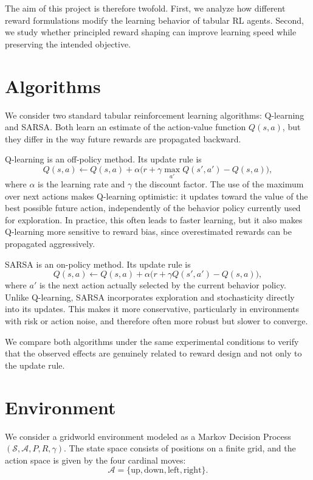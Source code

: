 \documentclass[10pt]{article}
\begin{document}
The aim of this project is therefore twofold. First, we analyze how different reward formulations modify the learning behavior of tabular RL agents. Second, we study whether principled reward shaping can improve learning speed while preserving the intended objective.

\section{Algorithms}

We consider two standard tabular reinforcement learning algorithms: Q-learning and SARSA. Both learn an estimate of the action-value function $Q(s,a)$, but they differ in the way future rewards are propagated backward.

Q-learning is an off-policy method. Its update rule is
\[
	Q(s,a) \leftarrow Q(s,a) + \alpha \bigl(r + \gamma \max_{a'} Q(s',a') - Q(s,a)\bigr),
\]
where $\alpha$ is the learning rate and $\gamma$ the discount factor. The use of the maximum over next actions makes Q-learning optimistic: it updates toward the value of the best possible future action, independently of the behavior policy currently used for exploration. In practice, this often leads to faster learning, but it also makes Q-learning more sensitive to reward bias, since overestimated rewards can be propagated aggressively.

SARSA is an on-policy method. Its update rule is
\[
	Q(s,a) \leftarrow Q(s,a) + \alpha \bigl(r + \gamma Q(s',a') - Q(s,a)\bigr),
\]
where $a'$ is the next action actually selected by the current behavior policy. Unlike Q-learning, SARSA incorporates exploration and stochasticity directly into its updates. This makes it more conservative, particularly in environments with risk or action noise, and therefore often more robust but slower to converge.

We compare both algorithms under the same experimental conditions to verify that the observed effects are genuinely related to reward design and not only to the update rule.

\section{Environment}

We consider a gridworld environment modeled as a Markov Decision Process $(\mathcal{S}, \mathcal{A}, P, R, \gamma)$. The state space consists of positions on a finite grid, and the action space is given by the four cardinal moves:
\[
	\mathcal{A} = \{\text{up}, \text{down}, \text{left}, \text{right}\}.
\]
\end{document}
